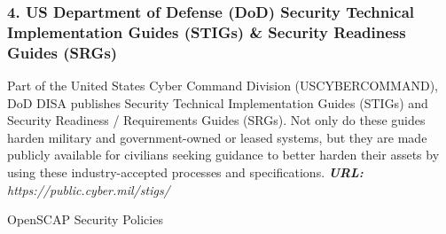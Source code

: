 \subsubsection{4. US Department of Defense (DoD) Security Technical Implementation Guides (STIGs) \& Security Readiness Guides (SRGs)}
Part of the United States Cyber Command Division (USCYBERCOMMAND), DoD DISA publishes Security Technical Implementation Guides (STIGs) and Security Readiness / Requirements Guides (SRGs). Not only do these guides harden military and government-owned or leased systems, but they are made publicly available for civilians seeking guidance to better harden their assets by using these industry-accepted processes and specifications.
\textit{\textbf{URL:} https://public.cyber.mil/stigs/} 

OpenSCAP Security Policies